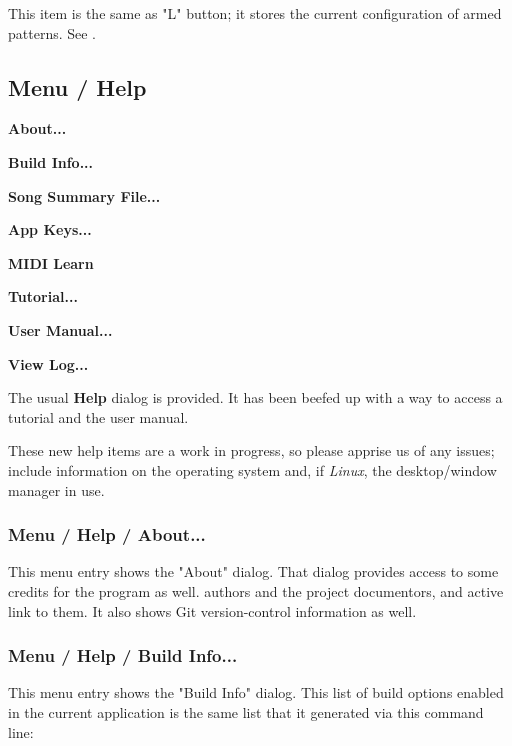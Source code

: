    This item is the same as "L" button; it stores the current configuration
   of armed patterns.
   See .

\subsection{Menu / Help}
\label{subsec:menu_help}

   \begin{enumber}
      \item \textbf{About...}
      \item \textbf{Build Info...}
      \item \textbf{Song Summary File...}
      \item \textbf{App Keys...}
      \item \textbf{MIDI Learn}
      \item \textbf{Tutorial...}
      \item \textbf{User Manual...}
      \item \textbf{View Log...}
   \end{enumber}

   The usual \textbf{Help} dialog is provided.
   It has been beefed up with a way to access a
   tutorial and the user manual.

   These new help items are a work in progress, so please apprise
   us of any issues; include information on the operating system and,
   if \textsl{Linux}, the desktop/window manager in use.

\subsubsection{Menu / Help / About...}
\label{subsubsec:menu_help_about}

   This menu entry shows the "About" dialog.
   That dialog provides access to some credits for the program as well.
   authors and the project documentors, and active link to them.
   It also shows Git version-control information as well.

\subsubsection{Menu / Help / Build Info...}
\label{subsubsec:menu_help_build_info}

   This menu entry shows the "Build Info" dialog.  This list of
   build options enabled in the current application is the same list
   that it generated via this command line:


